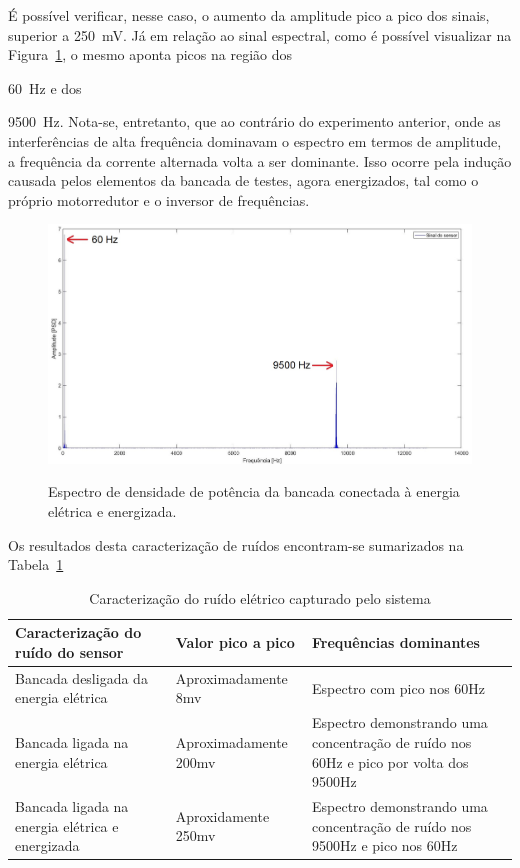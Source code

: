 \documentclass[
	12pt,				
	oneside,			
	a4paper,			
	english,			
	brazil,			
	]{abntex2ppgsi}
\begin{document}
{{{É possível verificar, nesse caso, o aumento da amplitude pico a pico dos sinais, superior a {\SI{250}{\milli\volt}}. Já em relação ao sinal espectral, como é possível visualizar na Figura~\ref{PSD_SENSOR_MAQUINA_LIGADA_E_ENERGIZADA}, o mesmo aponta picos na região dos {\SI{60}{\hertz} e dos {\SI{9500}{\hertz}. Nota-se, entretanto, que ao contrário do experimento anterior, onde as interferências de alta frequência dominavam o espectro em termos de amplitude, a frequência da corrente alternada volta a ser dominante. Isso ocorre pela indução causada pelos elementos da bancada de testes, agora energizados, tal como o próprio motorredutor e o inversor de frequências.   

\begin{figure}[H]
\centering
\caption {Espectro de densidade de potência da bancada conectada à energia elétrica e energizada.}
\includegraphics[width=170mm,keepaspectratio]{GraficosAnalise/PSD_SENSOR_MAQUINA_LIGADA_E_ENERGIZADA}
\label{PSD_SENSOR_MAQUINA_LIGADA_E_ENERGIZADA}
\end{figure} 

Os resultados desta caracterização de ruídos encontram-se sumarizados na Tabela~\ref{tab:caraterizaçãoSinal}

\begin{table}[h]
\caption{Caracterização do ruído elétrico capturado pelo sistema}
\begin{tabularx}{\textwidth}{|X|X|X|}
\hline
Caracterização do ruído do sensor               & Valor pico a pico    & Frequências dominantes                                                               \\ \hline
Bancada desligada da energia elétrica           & Aproximadamente 8mv  & Espectro com pico nos 60Hz                                                           \\ \hline
Bancada ligada na energia elétrica              & Aproximadamente 200mv & Espectro demonstrando uma concentração de ruído nos 60Hz e pico por volta dos 9500Hz \\ \hline
Bancada ligada na energia elétrica e energizada & Aproxidamente 250mv  & Espectro demonstrando uma concentração de ruído nos 9500Hz e pico nos 60Hz           \\ \hline
\end{tabularx}
\label{tab:caraterizaçãoSinal}
\end{table}

}}}}}
\end{document}
